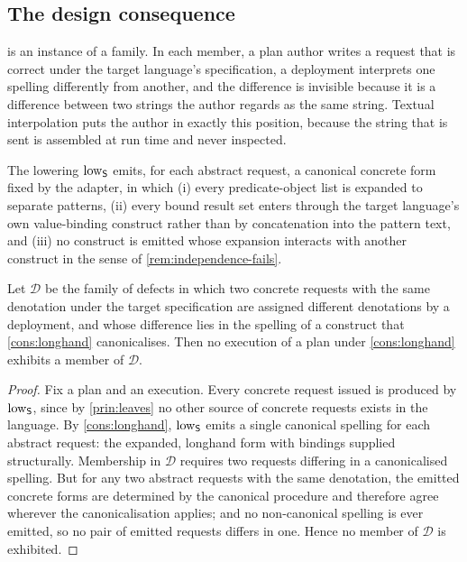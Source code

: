 \subsection{The design consequence}

 is an instance of a family. In each member, a plan author
writes a request that is correct under the target language's specification, a
deployment interprets one spelling differently from another, and the difference
is invisible because it is a difference between two strings the author regards
as the same string. Textual interpolation puts the author in exactly this
position, because the string that is sent is assembled at run time and never
inspected.

\begin{construction}
\label{cons:longhand}
The lowering $\mathrm{low}_{\mathsf{S}}$ emits, for each abstract request, a canonical concrete
form fixed by the adapter, in which (i) every predicate-object list is expanded
to separate patterns, (ii) every bound result set enters through the target
language's own value-binding construct rather than by concatenation into the
pattern text, and (iii) no construct is emitted whose expansion interacts with
another construct in the sense of \cref{rem:independence-fails}.
\end{construction}

\begin{theorem}
\label{thm:interpolation}
Let $\mathcal{D}$ be the family of defects in which two concrete requests with
the same denotation under the target specification are assigned different
denotations by a deployment, and whose difference lies in the spelling of a
construct that \cref{cons:longhand} canonicalises. Then no execution of a plan
under \cref{cons:longhand} exhibits a member of $\mathcal{D}$.
\end{theorem}

\begin{proof}
Fix a plan and an execution. Every concrete request issued is produced by
$\mathrm{low}_{\mathsf{S}}$, since by \cref{prin:leaves} no other source of concrete requests
exists in the language. By \cref{cons:longhand}, $\mathrm{low}_{\mathsf{S}}$ emits a single
canonical spelling for each abstract request: the expanded, longhand form with
bindings supplied structurally. Membership in $\mathcal{D}$ requires two
requests differing in a canonicalised spelling. But for any two abstract
requests with the same denotation, the emitted concrete forms are determined by
the canonical procedure and therefore agree wherever the canonicalisation
applies; and no non-canonical spelling is ever emitted, so no pair of emitted
requests differs in one. Hence no member of $\mathcal{D}$ is exhibited.
\end{proof}

